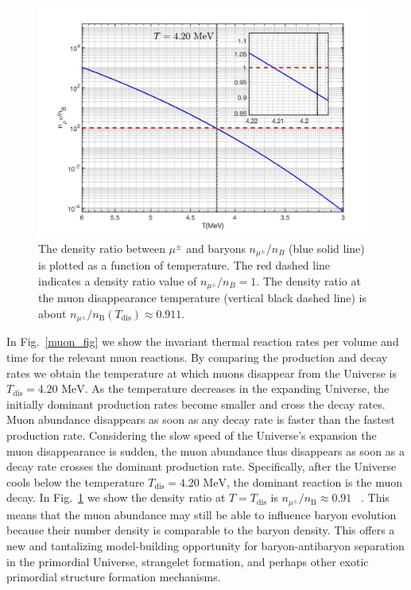 \documentclass[universe,article,submit,moreauthors,pdftex,a4paper]{Definitions/mdpi}
\newcommand{\MeV}{\text{ MeV}}
\newcommand*{\rf}[1]{Fig.~{\ref{#1}}}
\begin{document}
\begin{figure}[h]
\centering
\includegraphics[width=0.9\columnwidth]{./plots/DensityRatio_new2.jpg}
\caption{The density ratio between $\mu^\pm$ and baryons $n_{\mu^{\pm}}/n_{B}$ (blue solid line) is plotted as a function of temperature. The red dashed line indicates a density ratio value of $n_{\mu^{\pm}}/n_{B}=1$. The density ratio at the muon disappearance temperature (vertical black dashed line) is about $n_{\mu^\pm}/n_\mathrm{B}(T_\mathrm{dis})\approx0.911$.}
\label{muonRatio_fig} 
\end{figure}

In \rf{muon_fig} we show the invariant thermal reaction rates per volume and time for the relevant muon reactions. By comparing the production and decay rates we obtain the temperature at which muons disappear from the Universe is $T_\mathrm{dis} = 4.20\MeV$. As the temperature decreases in the expanding Universe, the initially dominant production rates become smaller and cross the decay rates. Muon abundance disappears as soon as any decay rate is faster than the fastest production rate. Considering the slow speed of the Universe's expansion the muon disappearance is sudden, the muon abundance thus disappears as soon as a decay rate crosses the dominant production rate. Specifically, after the Universe cools below the temperature $T_\mathrm{dis} = 4.20\MeV$, the dominant reaction is the muon decay. In \rf{muonRatio_fig} we show the density ratio at $T=T_\mathrm{dis}$ is $n_{\mu^\pm}/n_\mathrm{B}\approx0.91$~\cite{Yang:2021bko} . This means that the muon abundance may still be able to influence baryon evolution because their number density is comparable to the baryon density. This offers a new and tantalizing model-building opportunity for baryon-antibaryon separation in the primordial Universe, strangelet formation, and perhaps other exotic primordial structure formation mechanisms.
\end{document}
